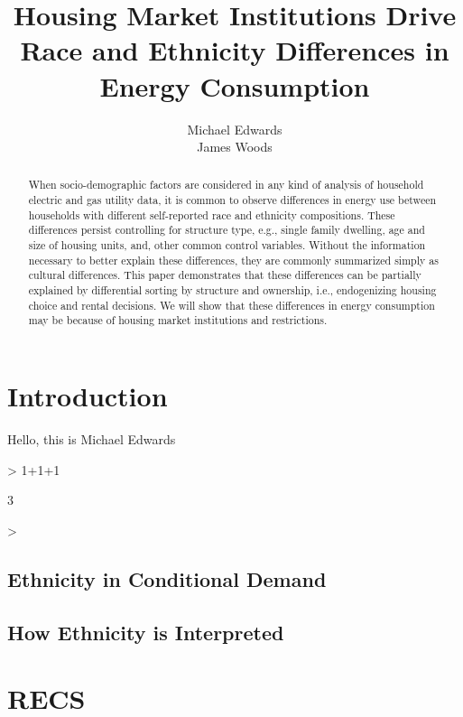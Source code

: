 \documentclass{article}
\author{Michael Edwards\\ 
  James Woods}
\title{Housing Market Institutions Drive Race and Ethnicity Differences in Energy Consumption}
\begin{document}
\maketitle


\begin{abstract}

When socio-demographic factors are considered in any kind of analysis of household electric and gas utility data, it is common to observe differences in energy use between households with different self-reported race and ethnicity compositions. These differences persist controlling for structure type, e.g., single family dwelling, age and size of housing units, and, other common control variables. Without the information necessary to better explain these differences, they are commonly summarized simply as cultural differences. This paper demonstrates that these differences can be partially explained by differential sorting by structure and ownership, i.e., endogenizing housing choice and rental decisions. We will show that these differences in energy consumption may be because of housing market institutions and restrictions.
\end{abstract}

\section{Introduction}
  Hello, this is Michael Edwards

\begin{Schunk}
\begin{Sinput}
> 1+1+1
\end{Sinput}
\begin{Soutput}
[1] 3
\end{Soutput}
\begin{Sinput}
> 
\end{Sinput}
\end{Schunk}

\cite{RBase}

  \subsection{Ethnicity in Conditional Demand}
  \subsection{How Ethnicity is Interpreted}

\section{RECS}
\end{document}
